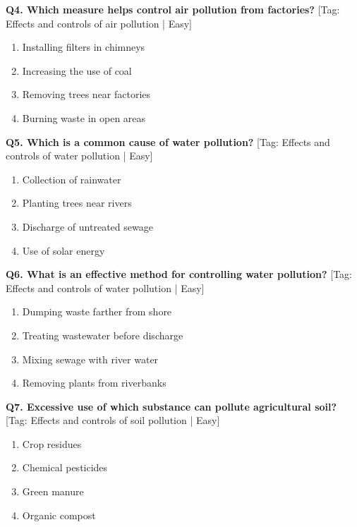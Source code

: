 \noindent\textbf{Q4. Which measure helps control air pollution from factories?} \hfill [Tag: Effects and controls of air pollution | Easy]
\begin{enumerate}[label=(\alph*),topsep=2pt,itemsep=1pt,partopsep=0pt,parsep=0pt]
    \item {Installing filters in chimneys}
    \item {Increasing the use of coal}
    \item {Removing trees near factories}
    \item {Burning waste in open areas}
\end{enumerate}
\vspace{2mm}

\noindent\textbf{Q5. Which is a common cause of water pollution?} \hfill [Tag: Effects and controls of water pollution | Easy]
\begin{enumerate}[label=(\alph*),topsep=2pt,itemsep=1pt,partopsep=0pt,parsep=0pt]
    \item {Collection of rainwater}
    \item {Planting trees near rivers}
    \item {Discharge of untreated sewage}
    \item {Use of solar energy}
\end{enumerate}
\vspace{2mm}

\noindent\textbf{Q6. What is an effective method for controlling water pollution?} \hfill [Tag: Effects and controls of water pollution | Easy]
\begin{enumerate}[label=(\alph*),topsep=2pt,itemsep=1pt,partopsep=0pt,parsep=0pt]
    \item {Dumping waste farther from shore}
    \item {Treating wastewater before discharge}
    \item {Mixing sewage with river water}
    \item {Removing plants from riverbanks}
\end{enumerate}
\vspace{2mm}

\noindent\textbf{Q7. Excessive use of which substance can pollute agricultural soil?} \hfill [Tag: Effects and controls of soil pollution | Easy]
\begin{enumerate}[label=(\alph*),topsep=2pt,itemsep=1pt,partopsep=0pt,parsep=0pt]
    \item {Crop residues}
    \item {Chemical pesticides}
    \item {Green manure}
    \item {Organic compost}
\end{enumerate}
\vspace{2mm}

